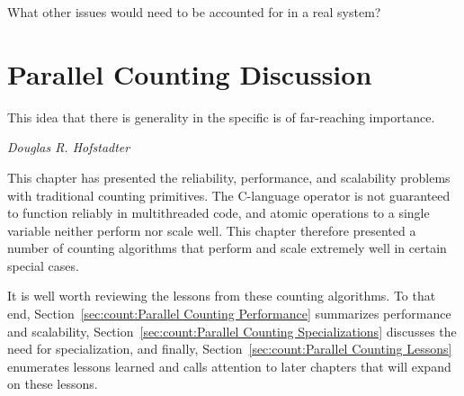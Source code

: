 \QuickQuiz{}
	What other issues would need to be accounted for in a real system?
 \QuickQuizEnd

\section{Parallel Counting Discussion}
\label{sec:count:Parallel Counting Discussion}
%
\epigraph{This idea that there is generality in the specific is of
	  far-reaching importance.}
	 {\emph{Douglas R. Hofstadter}}

This chapter has presented the reliability, performance, and
scalability problems with traditional counting primitives.
The C-language \co{++} operator is not guaranteed to function reliably in
multithreaded code, and atomic operations to a single variable neither
perform nor scale well.
This chapter therefore presented a number of counting algorithms that
perform and scale extremely well in certain special cases.

It is well worth reviewing the lessons from these counting algorithms.
To that end,
Section~\ref{sec:count:Parallel Counting Performance}
summarizes performance and scalability,
Section~\ref{sec:count:Parallel Counting Specializations}
discusses the need for specialization,
and finally,
Section~\ref{sec:count:Parallel Counting Lessons}
enumerates lessons learned and calls attention to later chapters that
will expand on these lessons.

